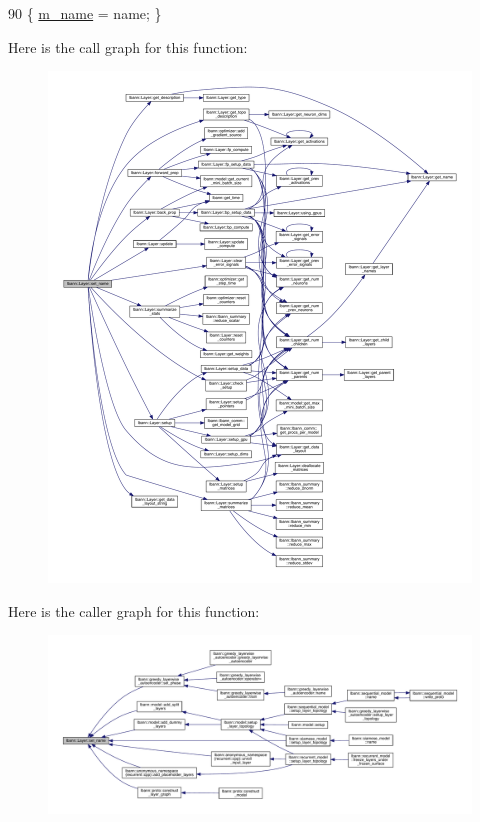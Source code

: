 \begin{DoxyCode}
90 \{ \hyperlink{classlbann_1_1Layer_aa47109ad09b399142fa92f9d3702189f}{m\_name} = name; \}
\end{DoxyCode}
Here is the call graph for this function\+:\nopagebreak
\begin{figure}[H]
\begin{center}
\leavevmode
\includegraphics[width=350pt]{classlbann_1_1Layer_a82d8a038861b0af0d54fbf44ce715839_cgraph}
\end{center}
\end{figure}
Here is the caller graph for this function\+:\nopagebreak
\begin{figure}[H]
\begin{center}
\leavevmode
\includegraphics[width=350pt]{classlbann_1_1Layer_a82d8a038861b0af0d54fbf44ce715839_icgraph}
\end{center}
\end{figure}
\mbox{\label{classlbann_1_1Layer_a524a78dc6a812ae92834a9e1aa83434b}} 

